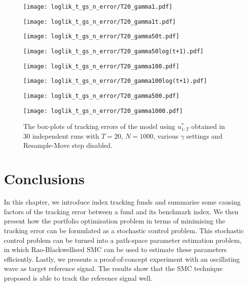 \begin{figure}[!thbp]
    \centering
    \begin{minipage}{.5\textwidth}
        \centering
        \texttt{[image: loglik\_t\_gs\_n\_error/T20\_gamma1.pdf]}
    \end{minipage}%
    \begin{minipage}{0.5\textwidth}
        \centering
        \texttt{[image: loglik\_t\_gs\_n\_error/T20\_gamma1t.pdf]}
    \end{minipage}
    \begin{minipage}{0.5\textwidth}
        \centering
        \texttt{[image: loglik\_t\_gs\_n\_error/T20\_gamma50t.pdf]}
    \end{minipage}%
    \begin{minipage}{0.5\textwidth}
        \centering
        \texttt{[image: loglik\_t\_gs\_n\_error/T20\_gamma50log(t+1).pdf]}
    \end{minipage}
    \begin{minipage}{0.5\textwidth}
        \centering
        \texttt{[image: loglik\_t\_gs\_n\_error/T20\_gamma100.pdf]}
    \end{minipage}%
    \begin{minipage}{0.5\textwidth}
        \centering
        \texttt{[image: loglik\_t\_gs\_n\_error/T20\_gamma100log(t+1).pdf]}
    \end{minipage}
    \begin{minipage}{0.5\textwidth}
        \centering
        \texttt{[image: loglik\_t\_gs\_n\_error/T20\_gamma500.pdf]}
    \end{minipage}%
    \begin{minipage}{0.5\textwidth}
        \centering
        \texttt{[image: loglik\_t\_gs\_n\_error/T20\_gamma1000.pdf]}
    \end{minipage}
    \caption{The box-plots of tracking errors of the model using $u^*_{1:T}$ obtained in $30$ independent runs with $T=20$, $N=1000$, various $\gamma$ settings and Resample-Move step disabled.}
    \label{fig:error}
\end{figure}

\section{Conclusions}
In this chapter, we introduce index tracking funds and summarise some causing factors of the tracking error between a fund and its benchmark index. We then present how the portfolio optimisation problem in terms of minimising the tracking error can be formulated as a stochastic control problem. This stochastic control problem can be turned into a path-space parameter estimation problem, in which Rao-Blackwellised SMC can be used to estimate these parameters efficiently. Lastly, we presents a proof-of-concept experiment with an oscillating wave as target reference signal. The results show that the SMC technique proposed is able to track the reference signal well.


